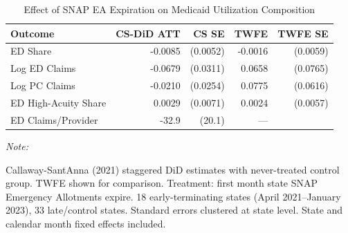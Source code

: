 \begin{table}[!h]
\centering
\caption{Effect of SNAP EA Expiration on Medicaid Utilization Composition}
\centering
\begin{threeparttable}
\begin{tabular}[t]{lrrrr}
\toprule
Outcome & CS-DiD ATT & CS SE & TWFE & TWFE SE\\
\midrule
ED Share & -0.0085 & (0.0052) & -0.0016 & (0.0059)\\
Log ED Claims & -0.0679 & (0.0311) & 0.0658 & (0.0765)\\
Log PC Claims & -0.0210 & (0.0254) & 0.0775 & (0.0616)\\
ED High-Acuity Share & 0.0029 & (0.0071) & 0.0024 & (0.0057)\\
ED Claims/Provider & -32.9 & (20.1) & --- & \\
\bottomrule
\end{tabular}
\begin{tablenotes}
\item \textit{Note: } 
\item Callaway-Sant\textquotesingle Anna (2021) staggered DiD estimates with never-treated control group. TWFE shown for comparison. Treatment: first month state SNAP Emergency Allotments expire. 18 early-terminating states (April 2021--January 2023), 33 late/control states. Standard errors clustered at state level. State and calendar month fixed effects included.
\end{tablenotes}
\end{threeparttable}
\end{table}

